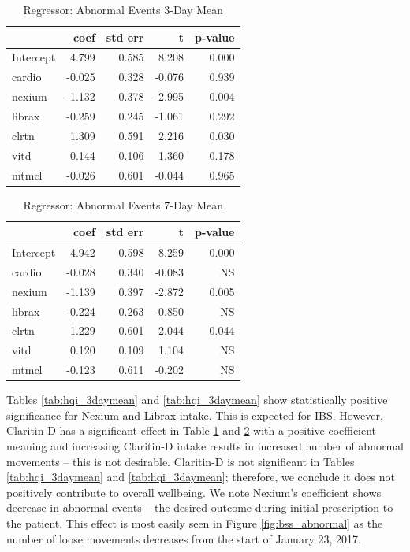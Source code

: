 \documentclass[conference]{IEEEtran}
\begin{document}
\begin{table}
\begin{center}
    \caption{Regressor: Abnormal Events 3-Day Mean} \label{tab:abnormal_3daymean}
    \begin{tabular}{ | l | r | r | r | r |}
    \hline
     & coef & std err & t & p-value \\ \hline
Intercept & 4.799 & 0.585 & 8.208 & 0.000 \\
cardio & -0.025 & 0.328 & -0.076 & 0.939 \\
nexium & -1.132 & 0.378 & -2.995 & 0.004 \\
librax & -0.259 & 0.245 & -1.061 & 0.292 \\
clrtn & 1.309 & 0.591 & 2.216 & 0.030 \\
vitd & 0.144 & 0.106 & 1.360 & 0.178 \\
mtmcl & -0.026 & 0.601 & -0.044 & 0.965 \\
    \hline
    \end{tabular}
\end{center}
\end{table}

\begin{table}
\begin{center}
\caption{Regressor: Abnormal Events 7-Day Mean} \label{tab:abnormal_7daymean}
    \begin{tabular}{ | l | r | r | r | r |}
    \hline
     & coef & std err & t & p-value \\ \hline
Intercept & 4.942 & 0.598 & 8.259 & 0.000 \\
cardio & -0.028 & 0.340 & -0.083 & NS \\
nexium & -1.139 & 0.397 & -2.872 & 0.005 \\
librax & -0.224 & 0.263 & -0.850 & NS \\
clrtn & 1.229 & 0.601 & 2.044 & 0.044 \\
vitd & 0.120 & 0.109 & 1.104 & NS \\
mtmcl & -0.123 & 0.611 & -0.202 & NS \\
    \hline
    \end{tabular}
\end{center}
\end{table}

Tables \ref{tab:hqi_3daymean} and \ref{tab:hqi_3daymean} show statistically positive significance for Nexium and Librax intake.  This is expected for IBS.  However, Claritin-D has a significant effect in Table \ref{tab:abnormal_3daymean} and \ref{tab:abnormal_7daymean} with a positive coefficient  meaning and increasing Claritin-D intake results in increased number of abnormal movements -- this is not desirable. Claritin-D is not significant in Tables \ref{tab:hqi_3daymean} and \ref{tab:hqi_3daymean}; therefore, we conclude it does not positively contribute to overall wellbeing.  We note Nexium's coefficient shows decrease in abnormal events -- the desired outcome during initial prescription to the patient.  This effect is most easily seen in Figure \ref{fig:bss_abnormal} as the number of loose movements decreases from the start of January 23, 2017.
\end{document}
